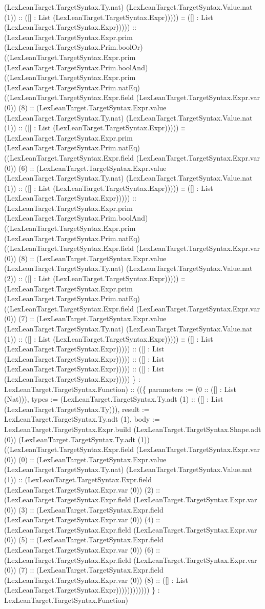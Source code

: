 \documentclass[11pt]{article}
\begin{document}
(LexLeanTarget.TargetSyntax.Ty.nat) (LexLeanTarget.TargetSyntax.Value.nat (1)) :: ([] : List (LexLeanTarget.TargetSyntax.Expr))))) :: ([] : List (LexLeanTarget.TargetSyntax.Expr))))) :: (LexLeanTarget.TargetSyntax.Expr.prim (LexLeanTarget.TargetSyntax.Prim.boolOr) ((LexLeanTarget.TargetSyntax.Expr.prim (LexLeanTarget.TargetSyntax.Prim.boolAnd) ((LexLeanTarget.TargetSyntax.Expr.prim (LexLeanTarget.TargetSyntax.Prim.natEq) ((LexLeanTarget.TargetSyntax.Expr.field (LexLeanTarget.TargetSyntax.Expr.var (0)) (8) :: (LexLeanTarget.TargetSyntax.Expr.value (LexLeanTarget.TargetSyntax.Ty.nat) (LexLeanTarget.TargetSyntax.Value.nat (1)) :: ([] : List (LexLeanTarget.TargetSyntax.Expr))))) :: (LexLeanTarget.TargetSyntax.Expr.prim (LexLeanTarget.TargetSyntax.Prim.natEq) ((LexLeanTarget.TargetSyntax.Expr.field (LexLeanTarget.TargetSyntax.Expr.var (0)) (6) :: (LexLeanTarget.TargetSyntax.Expr.value (LexLeanTarget.TargetSyntax.Ty.nat) (LexLeanTarget.TargetSyntax.Value.nat (1)) :: ([] : List (LexLeanTarget.TargetSyntax.Expr))))) :: ([] : List (LexLeanTarget.TargetSyntax.Expr))))) :: (LexLeanTarget.TargetSyntax.Expr.prim (LexLeanTarget.TargetSyntax.Prim.boolAnd) ((LexLeanTarget.TargetSyntax.Expr.prim (LexLeanTarget.TargetSyntax.Prim.natEq) ((LexLeanTarget.TargetSyntax.Expr.field (LexLeanTarget.TargetSyntax.Expr.var (0)) (8) :: (LexLeanTarget.TargetSyntax.Expr.value (LexLeanTarget.TargetSyntax.Ty.nat) (LexLeanTarget.TargetSyntax.Value.nat (2)) :: ([] : List (LexLeanTarget.TargetSyntax.Expr))))) :: (LexLeanTarget.TargetSyntax.Expr.prim (LexLeanTarget.TargetSyntax.Prim.natEq) ((LexLeanTarget.TargetSyntax.Expr.field (LexLeanTarget.TargetSyntax.Expr.var (0)) (7) :: (LexLeanTarget.TargetSyntax.Expr.value (LexLeanTarget.TargetSyntax.Ty.nat) (LexLeanTarget.TargetSyntax.Value.nat (1)) :: ([] : List (LexLeanTarget.TargetSyntax.Expr))))) :: ([] : List (LexLeanTarget.TargetSyntax.Expr))))) :: ([] : List (LexLeanTarget.TargetSyntax.Expr))))) :: ([] : List (LexLeanTarget.TargetSyntax.Expr))))) :: ([] : List (LexLeanTarget.TargetSyntax.Expr))))) \} : LexLeanTarget.TargetSyntax.Function) :: ((\{ parameters := (0 :: ([] : List (Nat))), types := (LexLeanTarget.TargetSyntax.Ty.adt (1) :: ([] : List (LexLeanTarget.TargetSyntax.Ty))), result := LexLeanTarget.TargetSyntax.Ty.adt (1), body := LexLeanTarget.TargetSyntax.Expr.build (LexLeanTarget.TargetSyntax.Shape.adt (0)) (LexLeanTarget.TargetSyntax.Ty.adt (1)) ((LexLeanTarget.TargetSyntax.Expr.field (LexLeanTarget.TargetSyntax.Expr.var (0)) (0) :: (LexLeanTarget.TargetSyntax.Expr.value (LexLeanTarget.TargetSyntax.Ty.nat) (LexLeanTarget.TargetSyntax.Value.nat (1)) :: (LexLeanTarget.TargetSyntax.Expr.field (LexLeanTarget.TargetSyntax.Expr.var (0)) (2) :: (LexLeanTarget.TargetSyntax.Expr.field (LexLeanTarget.TargetSyntax.Expr.var (0)) (3) :: (LexLeanTarget.TargetSyntax.Expr.field (LexLeanTarget.TargetSyntax.Expr.var (0)) (4) :: (LexLeanTarget.TargetSyntax.Expr.field (LexLeanTarget.TargetSyntax.Expr.var (0)) (5) :: (LexLeanTarget.TargetSyntax.Expr.field (LexLeanTarget.TargetSyntax.Expr.var (0)) (6) :: (LexLeanTarget.TargetSyntax.Expr.field (LexLeanTarget.TargetSyntax.Expr.var (0)) (7) :: (LexLeanTarget.TargetSyntax.Expr.field (LexLeanTarget.TargetSyntax.Expr.var (0)) (8) :: ([] : List (LexLeanTarget.TargetSyntax.Expr)))))))))))) \} : LexLeanTarget.TargetSyntax.Function) 
\end{document}
